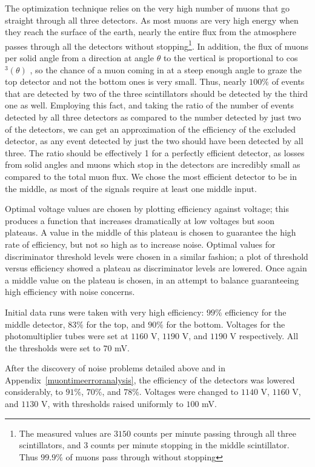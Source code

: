 The optimization technique relies on the very high number of muons that go straight through all three detectors. As most muons are very high energy when they reach the surface of the earth, nearly the entire flux from the atmosphere passes through all the detectors without stopping\footnote{The measured values are $3150$ counts per minute passing through all three scintillators, and $3$ counts per minute stopping in the middle scintillator. Thus $99.9\%$ of muons pass through without stopping}. In addition, the flux of muons per solid angle from a direction at angle $\theta$ to the vertical is proportional to cos$^3(\theta)$ \cite{frisch}, so the chance of a muon coming in at a steep enough angle to graze the top detector and not the bottom ones is very small. Thus, nearly $100\%$ of events that are detected by two of the three scintillators should be detected by the third one as well. Employing this fact, and taking the ratio of the number of events detected by all three detectors as compared to the number detected by just two of the detectors, we can get an approximation of the efficiency of the excluded detector, as any event detected by just the two should have been detected by all three. The ratio should be effectively 1 for a perfectly efficient detector, as losses from solid angles and muons which stop in the detectors are incredibly small as compared to the total muon flux. We chose the most efficient detector to be in the middle, as most of the signals require at least one middle input.

Optimal voltage values are chosen by plotting efficiency against voltage; this produces a function that increases dramatically at low voltages but soon plateaus. A value in the middle of this plateau is chosen to guarantee the high rate of efficiency, but not so high as to increase noise. Optimal values for discriminator threshold levels were chosen in a similar fashion; a plot of threshold versus efficiency showed a plateau as discriminator levels are lowered. Once again a middle value on the plateau is chosen, in an attempt to balance guaranteeing high efficiency with noise concerns.

Initial data runs were taken with very high efficiency: $99\%$ efficiency for the middle detector, $83\%$ for the top, and $90\%$ for the bottom. Voltages for the photomultiplier tubes were set at $1160$ V, $1190$ V, and $1190$ V respectively. All the thresholds were set to $70$ mV. 

After the discovery of noise problems detailed above and in Appendix~\ref{muontimeerroranalysis}, the efficiency of the detectors was lowered considerably, to $91\%$, $70\%$, and $78\%$. Voltages were changed to $1140$ V, $1160$ V, and $1130$ V, with thresholds raised uniformly to $100$ mV.

